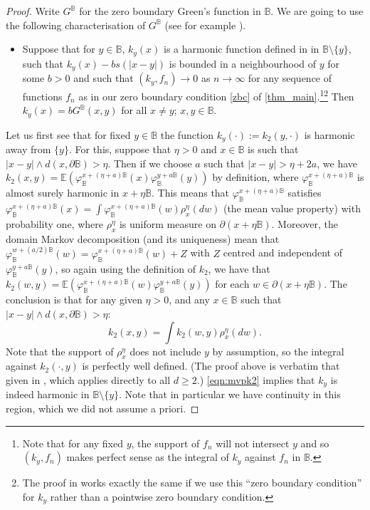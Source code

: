 \documentclass[JEP,XML,SOM,Unicode,published]{cedram}
\theoremstyle{definition}
\newcommand{\B}{\mathbb{B}}\let\D\B\let\Ub\B
\begin{document}
\begin{proof}
Write $G^\B$ for the zero boundary Green's function in $\B$.
We are going to use the following characterisation of $G^\B$ (see for example \cite[Lem.\,3.7]{WPgff}).
\begin{itemize}
\item[$(\star)$] Suppose that for $y\in \B$, $k_y(x)$ is a harmonic function defined in in $\B\setminus \{y\}$, such that $k_y(x)-bs(|x-y|)$ is bounded in a neighbourhood of $y$ for some $b > 0$ and such that $(k_y,f_n)\to 0$ as $n\to \infty$ for any sequence of functions $f_n$ as in our zero boundary condition \eqref{zbc} of \cref{thm_main}.\footnote{Note that for any fixed $y$, the support of $f_n$ will not intersect $y$ and so $(k_y,f_n)$ makes perfect sense as the integral of $k_y$ against $f_n$ in $\B$.}\footnote{The proof in \cite{WPgff} works exactly the same if we use this ``zero boundary condition'' for $k_y$ rather than a pointwise zero boundary condition.} Then $k_y(x)=bG^\B(x,y)$ for all $x\ne y$; $x,y\in \B$.
\end{itemize}

Let us first see that for fixed $y\in \B$ the function $k_y(\cdot):=k_2(y,\cdot)$ is harmonic away from $\{y\}$. For this, suppose that $\eta>0$ and $x\in \B$ is such that $|x-y|\wedge d(x,\partial \B)>\eta$. Then if we choose $a$ such that $|x-y|>\eta+2a$, we have $k_2(x,y)=\mathbb{E}(\varphi_{\B}^{x+(\eta+a)\B}(x)\varphi_{\B}^{y+a\B}(y))$ by definition, where $\varphi_{\B}^{x+(\eta+a)\B}$ is almost surely harmonic in $x+\eta\B$. This means that $\varphi_{\B}^{x+(\eta+a)\B}$ satisfies $\varphi_{\B}^{x+(\eta+a)\B}(x)=\int \varphi_{\B}^{x+(\eta+a)\B}(w) \rho_x^\eta(dw) $ (the mean value property) with probability one, where $\rho_{x}^\eta$ is uniform measure on $\partial(x+\eta\B)$. Moreover, the domain Markov decomposition (and its uniqueness) mean that $\varphi_{\B}^{w+(a/2)\B}(w)=\varphi_{\B}^{x+(\eta+a)\B}(w)+Z$ with $Z$ centred and independent of $\varphi_{\B}^{y+a\B}(y)$, so again using the definition of $k_2$, we have that $k_2(w,y)=\mathbb{E}(\varphi_{\B}^{x+(\eta+a)\B}(w)\varphi_{\B}^{y+a\B}(y))$ for each $w\in \partial(x+\eta\B)$. The conclusion is that for any given $\eta>0$, and any $x\in \B$ such that $|x-y|\wedge d(x,\partial \B)>\eta$:
\begin{equation} \label{eqn:mvpk2} k_2(x,y)=\int k_2(w,y) \rho_{x}^\eta(dw).\end{equation}
Note that the support of $\rho_x^\eta$ does not include $y$ by assumption, so the integral against $k_2(\cdot, y)$ is perfectly well defined. (The proof above is verbatim that given in \cite[Lem.\,2.9]{BPR18}, which applies directly to all $d\ge 2$.) \eqref{eqn:mvpk2} implies that $k_y$ is indeed harmonic in $\B\setminus \{y\}$. Note that in particular we have continuity in this region, which we did not assume a priori.


\end{proof}
\end{document}
